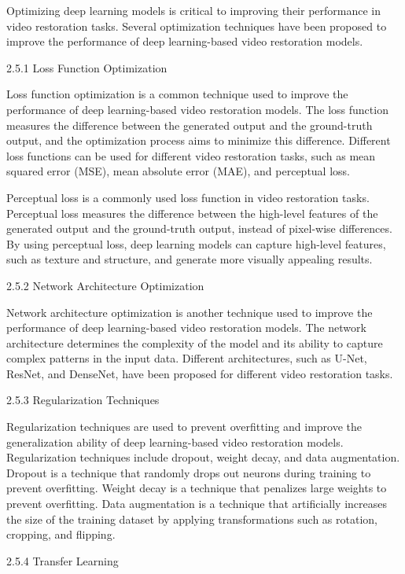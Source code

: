 \label{chap:Optimizations}

Optimizing deep learning models is critical to improving their performance in video restoration tasks. Several optimization techniques have been proposed to improve the performance of deep learning-based video restoration models.

2.5.1 Loss Function Optimization

Loss function optimization is a common technique used to improve the performance of deep learning-based video restoration models. The loss function measures the difference between the generated output and the ground-truth output, and the optimization process aims to minimize this difference. Different loss functions can be used for different video restoration tasks, such as mean squared error (MSE), mean absolute error (MAE), and perceptual loss.

Perceptual loss is a commonly used loss function in video restoration tasks. Perceptual loss measures the difference between the high-level features of the generated output and the ground-truth output, instead of pixel-wise differences. By using perceptual loss, deep learning models can capture high-level features, such as texture and structure, and generate more visually appealing results.

2.5.2 Network Architecture Optimization

Network architecture optimization is another technique used to improve the performance of deep learning-based video restoration models. The network architecture determines the complexity of the model and its ability to capture complex patterns in the input data. Different architectures, such as U-Net, ResNet, and DenseNet, have been proposed for different video restoration tasks.

2.5.3 Regularization Techniques

Regularization techniques are used to prevent overfitting and improve the generalization ability of deep learning-based video restoration models. Regularization techniques include dropout, weight decay, and data augmentation. Dropout is a technique that randomly drops out neurons during training to prevent overfitting. Weight decay is a technique that penalizes large weights to prevent overfitting. Data augmentation is a technique that artificially increases the size of the training dataset by applying transformations such as rotation, cropping, and flipping.

2.5.4 Transfer Learning

